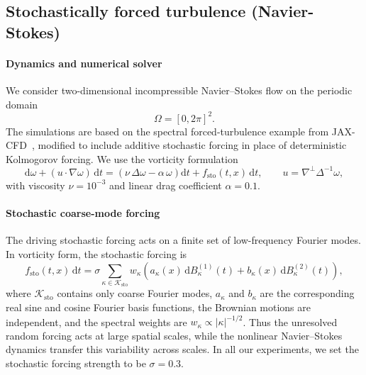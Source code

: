 \documentclass[oneside,11pt]{article}
\theoremstyle{remark}
\begin{document}
\subsection{Stochastically forced turbulence (Navier-Stokes)}
\label{appendix:Experiments:NavierStokes}

\paragraph{Dynamics and numerical solver}
We consider two-dimensional incompressible Navier--Stokes flow on the
periodic domain
\[
    \Omega = [0,2\pi]^2.
\]
The simulations are based on the spectral forced-turbulence example from
JAX-CFD~\cite{Kochkov2021-ML-CFD,Dresdner2022-Spectral-ML}, modified to include additive stochastic forcing in place of deterministic Kolmogorov forcing. We use the
vorticity formulation
\begin{equation}
    \mathrm d\omega
    +
    (u\cdot \nabla \omega)\,\mathrm dt
    =
    \left(\nu\,\Delta \omega - \alpha\,\omega\right)\mathrm dt
    +
    f_{\mathrm{sto}}(t,x)\,\mathrm dt,
    \qquad
    u = \nabla^\perp \Delta^{-1}\omega,
    \label{eq:appendix:ns-vorticity}
\end{equation}
with viscosity $\nu = 10^{-3}$ and linear drag coefficient $\alpha = 0.1$. 

\paragraph{Stochastic coarse-mode forcing}
The driving stochastic forcing acts on a finite set of low-frequency Fourier modes. In vorticity form, the stochastic forcing is
\begin{equation}
    f_{\mathrm{sto}}(t,x)\,\mathrm dt
    =
    \sigma
    \sum_{\kappa \in \mathcal K_{\mathrm{sto}}}w_\kappa
    \left(
        a_\kappa(x)\,\mathrm dB_\kappa^{(1)}(t)
        +
        b_\kappa(x)\,\mathrm dB_\kappa^{(2)}(t)
    \right),
    \label{eq:appendix:ns-stochastic-forcing}
\end{equation}
where $\mathcal K_{\mathrm{sto}}$ contains only coarse Fourier modes,
$a_\kappa$ and $b_\kappa$ are the corresponding real sine and cosine Fourier
basis functions, the Brownian motions are independent, and the spectral weights are $w_\kappa \propto |\kappa|^{-1/2}$. Thus the unresolved random forcing acts at large spatial scales, while the nonlinear Navier--Stokes dynamics transfer this variability across scales. In all our experiments, we set the stochastic forcing strength to be $\sigma = 0.3$.
\end{document}
